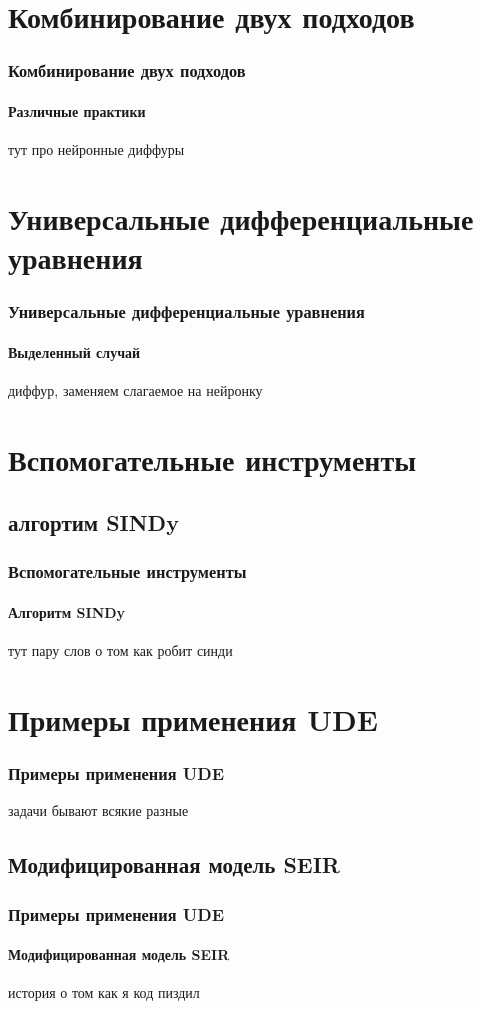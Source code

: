 \documentclass[10pt,pdf,hyperref={unicode}]{beamer}
\begin{document}
			
	\section{Комбинирование двух подходов}
		
		\begin{frame}
			\frametitle{Комбинирование двух подходов} 
			\framesubtitle{Различные практики}
				тут про нейронные диффуры 
		\end{frame}
		
		
	\section{Универсальные дифференциальные уравнения}
	
		\begin{frame}
			\frametitle{Универсальные дифференциальные уравнения} 
			\framesubtitle{Выделенный случай}
				диффур, заменяем слагаемое на нейронку 
		\end{frame}
	
	
	\section{Вспомогательные инструменты}
	
		\subsection{алгортим SINDy}
		
			\begin{frame}
				\frametitle{Вспомогательные инструменты} 
				\framesubtitle{Алгоритм SINDy}
					тут пару слов о том как робит синди  
			\end{frame}
		
		
	\section{Примеры применения UDE}
	
		\begin{frame}
			\frametitle{Примеры применения UDE} 
				задачи бывают всякие разные  
		\end{frame}
	
		
		\subsection{Модифицированная модель SEIR}
		
			\begin{frame}
				\frametitle{Примеры применения UDE} 
				\framesubtitle{Модифицированная модель SEIR}
					история о том как я код пиздил  
			\end{frame}
			
\end{document}
